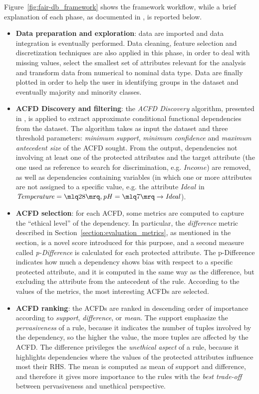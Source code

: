 Figure~\ref{fig:fair-db_framework} shows the framework workflow, while a brief explanation of each phase, as documented in \cite{azzalini2021fair}, is reported below.
\begin{itemize}
\item \textbf{Data preparation and exploration}: data are imported and data integration is eventually performed. Data cleaning, feature selection and discretization techniques are also applied in this phase, in order to deal with missing values, select the smallest set of attributes relevant for the analysis and transform data from numerical to nominal data type. Data are finally plotted in order to help the user in identifying groups in the dataset and eventually majority and minority classes.
\item \textbf{ACFD Discovery and filtering}: the \textit{ACFD Discovery} algorithm, presented in \cite{rammelaere2018revisiting}, is applied to extract approximate conditional functional dependencies from the dataset. The algorithm takes as input the dataset and three threshold parameters: \textit{minimum support}, \textit{minimum confidence} and \textit{maximum antecedent size} of the ACFD sought. From the output, dependencies not involving at least one of the protected attributes and the target attribute (the one used as reference to search for discrimination, e.g. \(\mathit{Income}\)) are removed, as well as dependencies containing variables (in which one or more attributes are not assigned to a specific value, e.g. the attribute \(\mathit{Ideal}\) in \(\mathit{Temperature} = \mlq 28 \mrq, \mathit{pH} = \mlq 7 \mrq \rightarrow \mathit{Ideal}\)).
\item \textbf{ACFD selection}: for each ACFD, some metrics are computed to capture the ``ethical level'' of the dependency. In particular, the \textit{difference} metric described in Section~\ref{section:evaluation_metrics}, as mentioned in the section, is a novel score introduced for this purpose, and a second measure called \textit{p-Difference} is calculated for each protected attribute. The p-Difference indicates how much a dependency shows bias with respect to a specific protected attribute, and it is computed in the same way as the difference, but excluding the attribute from the antecedent of the rule. According to the values of the metrics, the most interesting ACFDs are selected.
\item \textbf{ACFD ranking}: the ACFDs are ranked in descending order of importance according to \textit{support}, \textit{difference}, or \textit{mean}. The support emphasize the \textit{pervasiveness} of a rule, because it indicates the number of tuples involved by the dependency, so the higher the value, the more tuples are affected by the ACFD. The difference privileges the \textit{unethical aspect} of a rule, because it highlights dependencies where the values of the protected attributes influence most their RHS. The mean is computed as mean of support and difference, and therefore it gives more importance to the rules with the \textit{best trade-off} between pervasiveness and unethical perspective.

\end{itemize}
